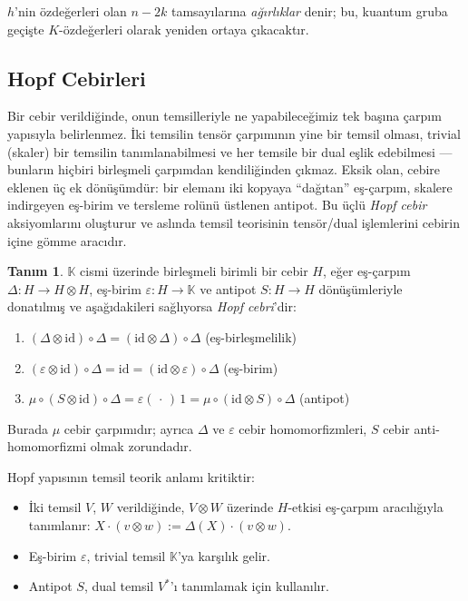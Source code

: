 \documentclass[10pt]{math}
\numberwithin{equation}{section}
\theoremstyle{plain}
\theoremstyle{definition}
\newtheorem{definition}[theorem]{Tanım}
\newcommand{\K}{\mathbb{K}}
\newcommand{\id}{\mathrm{id}}
\newcommand{\eps}{\varepsilon}
\newcommand{\cop}{\Delta}
\begin{document}
$h$'nin özdeğerleri olan $n - 2k$ tamsayılarına \emph{ağırlıklar} denir;
bu, kuantum gruba geçişte $K$-özdeğerleri olarak yeniden ortaya çıkacaktır.

\subsection{Hopf Cebirleri}

Bir cebir verildiğinde, onun temsilleriyle ne yapabileceğimiz tek başına çarpım
yapısıyla belirlenmez. İki temsilin tensör çarpımının yine bir temsil olması,
trivial (skaler) bir temsilin tanımlanabilmesi ve her temsile bir dual
eşlik edebilmesi --- bunların hiçbiri birleşmeli çarpımdan kendiliğinden çıkmaz.
Eksik olan, cebire eklenen üç ek dönüşümdür: bir elemanı iki kopyaya ``dağıtan''
eş-çarpım, skalere indirgeyen eş-birim ve tersleme rolünü üstlenen antipot. Bu
üçlü \emph{Hopf cebir} aksiyomlarını oluşturur ve aslında temsil teorisinin
tensör/dual işlemlerini cebirin içine gömme aracıdır.

\begin{definition}
$\K$ cismi üzerinde birleşmeli birimli bir cebir $H$, eğer eş-çarpım
$\cop : H \to H \otimes H$, eş-birim $\eps : H \to \K$ ve antipot
$S : H \to H$ dönüşümleriyle donatılmış ve aşağıdakileri sağlıyorsa
\emph{Hopf cebri}'dir:
\begin{enumerate}[leftmargin=*]
  \item $(\cop \otimes \id) \circ \cop = (\id \otimes \cop) \circ \cop$ \quad (eş-birleşmelilik)
  \item $(\eps \otimes \id) \circ \cop = \id = (\id \otimes \eps) \circ \cop$ \quad (eş-birim)
  \item $\mu \circ (S \otimes \id) \circ \cop = \eps(\,\cdot\,)\,1 = \mu \circ (\id \otimes S) \circ \cop$ \quad (antipot)
\end{enumerate}
Burada $\mu$ cebir çarpımıdır; ayrıca $\cop$ ve $\eps$ cebir homomorfizmleri,
$S$ cebir anti-homomorfizmi olmak zorundadır.
\end{definition}

Hopf yapısının temsil teorik anlamı kritiktir:
\begin{itemize}[leftmargin=*]
  \item İki temsil $V$, $W$ verildiğinde, $V \otimes W$ üzerinde $H$-etkisi
        eş-çarpım aracılığıyla tanımlanır: $X \cdot (v \otimes w) := \cop(X) \cdot (v \otimes w)$.
  \item Eş-birim $\eps$, trivial temsil $\K$'ya karşılık gelir.
  \item Antipot $S$, dual temsil $V^*$'ı tanımlamak için kullanılır.
\end{itemize}
\end{document}
